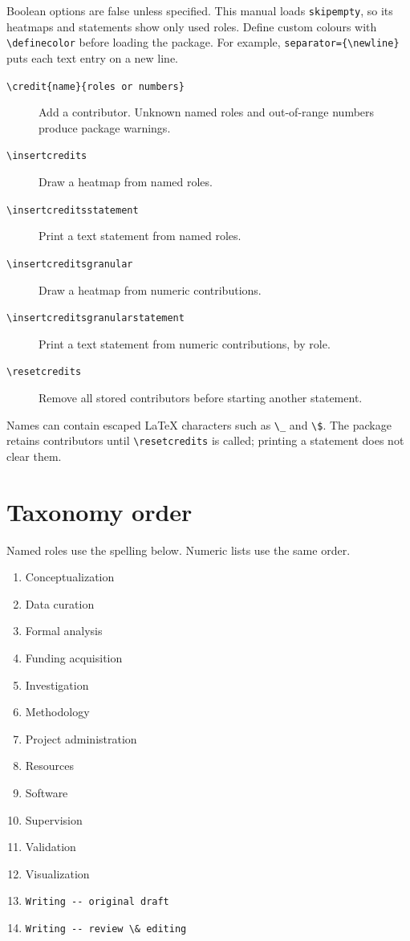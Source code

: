 \documentclass[a4paper,11pt]{article}
\begin{document}
\medskip
Boolean options are false unless specified. This manual loads
\texttt{skipempty}, so its heatmaps and statements show only used roles.
Define custom colours with \verb|\definecolor| before loading the package.
For example, \verb|separator={\newline}| puts each text entry on a new line.

\begin{description}
\item[\texttt{\textbackslash credit\{name\}\{roles or numbers\}}]
  Add a contributor. Unknown named roles and out-of-range numbers produce
  package warnings.
\item[\texttt{\textbackslash insertcredits}]
  Draw a heatmap from named roles.
\item[\texttt{\textbackslash insertcreditsstatement}]
  Print a text statement from named roles.
\item[\texttt{\textbackslash insertcreditsgranular}]
  Draw a heatmap from numeric contributions.
\item[\texttt{\textbackslash insertcreditsgranularstatement}]
  Print a text statement from numeric contributions, by role.
\item[\texttt{\textbackslash resetcredits}]
  Remove all stored contributors before starting another statement.
\end{description}

Names can contain escaped LaTeX characters such as \verb|\_| and
\verb|\$|. The package retains contributors until \verb|\resetcredits|
is called; printing a statement does not clear them.

\section{Taxonomy order}\label{sec:roles}

Named roles use the spelling below. Numeric lists use the same order.
\begin{enumerate}
\item Conceptualization
\item Data curation
\item Formal analysis
\item Funding acquisition
\item Investigation
\item Methodology
\item Project administration
\item Resources
\item Software
\item Supervision
\item Validation
\item Visualization
\item \verb|Writing -- original draft|
\item \verb|Writing -- review \& editing|
\end{enumerate}
\end{document}
